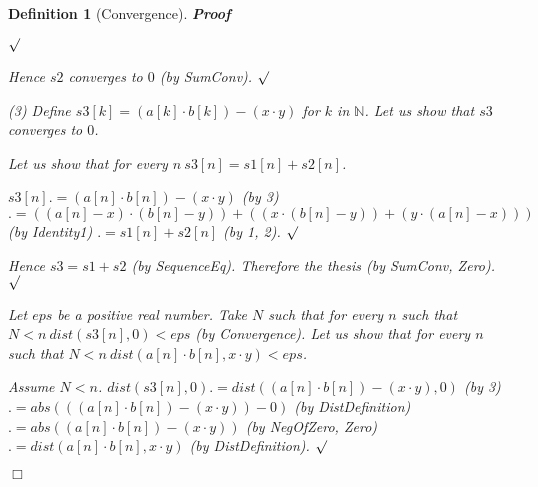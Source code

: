 \documentclass{article}
\newenvironment{forthel}{\begin{leftbar}}{\end{leftbar}}
\newenvironment{proof}{\noindent\textbf{Proof\ }}{\hspace*{\fill}$\Box$\medskip}
\newenvironment{subproof}{\begin{list}{}{}
		\item[\text{Proof}]}{\hfill $\surd$ \end{list}}
\newtheorem{definition}{Definition}
\newcommand{\NN}{\mathbb{N}}
\newcommand{\plusone}{+}
\begin{document}
\begin{forthel}
\begin{definition}[Convergence]
\begin{proof}
\begin{subproof}
\begin{subproof}
	\end{subproof}
	Hence $s2$ converges to $0$ (by SumConv).
	\end{subproof}
	(3) Define $s3[k] = (a[k] \cdot b[k]) - (x \cdot y)$ for $k$ in $\NN$.
	Let us show that $s3$ converges to $0$.
	\begin{subproof}
	Let us show that for every $n \ s3[n] = s1[n] + s2[n]$.
	\begin{subproof}
	$s3[n] .= (a[n] \cdot b[n]) - (x \cdot y)$ (by 3)
	$.= ((a[n] - x) \cdot (b[n] - y)) + ((x \cdot (b[n] - y)) + (y \cdot (a[n] - x)))$ (by Identity1)
	$.= s1[n] + s2[n]$ (by 1, 2).
	\end{subproof}
	Hence $s3 = s1 \plusone s2$ (by SequenceEq).
	Therefore the thesis (by SumConv, Zero).
	\end{subproof}
	Let $eps$ be a positive real number.
	Take $N$ such that for every $n$ such that $N < n \ dist(s3[n],0) < eps$ (by Convergence).
	Let us show that for every $n$ such that $N < n \ dist(a[n] \cdot b[n],x \cdot y) < eps$.
	\begin{subproof}
	Assume $N < n$.
	$dist(s3[n],0) .= dist((a[n] \cdot b[n]) - (x \cdot y),0)$ (by 3)
	$.= abs(((a[n] \cdot b[n]) - (x \cdot y)) - 0)$ (by DistDefinition)
	$.= abs((a[n] \cdot b[n]) - (x \cdot y))$ (by NegOfZero, Zero)
	$.= dist(a[n] \cdot b[n],x \cdot y)$ (by DistDefinition).
	\end{subproof}
	\end{proof}


\end{definition}
\end{forthel}
\end{document}
